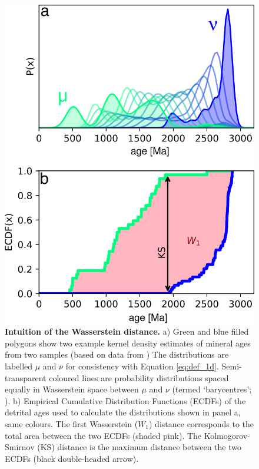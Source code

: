 \documentclass[gchron, manuscript]{copernicus}
\begin{document}
\begin{figure}
    \centering
    \includegraphics{figures/fig01.png}
    \caption{\textbf{Intuition of the Wasserstein distance.} a) Green and blue filled polygons show two example kernel density estimates of mineral ages from two samples (based on data from \citealt{morton_provenance_2008}) The distributions are labelled $\mu$ and $\nu$ for consistency with Equation \ref{eq:def_1d}. Semi-transparent coloured lines are probability distributions spaced equally in Wasserstein space between $\mu$ and $\nu$ (termed `barycentres'; \citealt{benamou_iterative_2015}). b) Empirical Cumulative Distribution Functions (ECDFs) of the detrital ages used to calculate the distributions shown in panel a, same colours. The first Wasserstein ($W_1$) distance corresponds to the total area between the two ECDFs (shaded pink). The Kolmogorov-Smirnov (KS) distance is the maximum distance between the two ECDFs (black double-headed arrow).}
    \label{fig:intro}
\end{figure}
\end{document}
